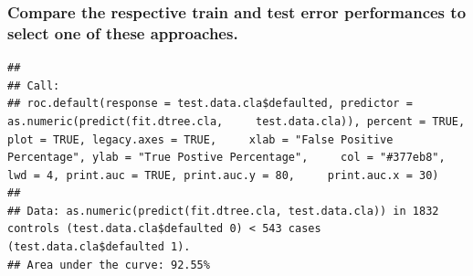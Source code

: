 \documentclass[]{article}
\newenvironment{Shaded}{\begin{snugshade}}{\end{snugshade}}
\newcommand{\DataTypeTok}[1]{\textcolor[rgb]{0.13,0.29,0.53}{#1}}
\newcommand{\DecValTok}[1]{\textcolor[rgb]{0.00,0.00,0.81}{#1}}
\newcommand{\KeywordTok}[1]{\textcolor[rgb]{0.13,0.29,0.53}{\textbf{#1}}}
\newcommand{\NormalTok}[1]{#1}
\newcommand{\OperatorTok}[1]{\textcolor[rgb]{0.81,0.36,0.00}{\textbf{#1}}}
\newcommand{\OtherTok}[1]{\textcolor[rgb]{0.56,0.35,0.01}{#1}}
\newcommand{\StringTok}[1]{\textcolor[rgb]{0.31,0.60,0.02}{#1}}
\begin{document}
\hypertarget{compare-the-respective-train-and-test-error-performances-to-select-one-of-these-approaches.}{%
\subsubsection{Compare the respective train and test error performances
to select one of these
approaches.}\label{compare-the-respective-train-and-test-error-performances-to-select-one-of-these-approaches.}}

\begin{Shaded}
\end{Shaded}

\begin{verbatim}
## 
## Call:
## roc.default(response = test.data.cla$defaulted, predictor = as.numeric(predict(fit.dtree.cla,     test.data.cla)), percent = TRUE, plot = TRUE, legacy.axes = TRUE,     xlab = "False Positive Percentage", ylab = "True Postive Percentage",     col = "#377eb8", lwd = 4, print.auc = TRUE, print.auc.y = 80,     print.auc.x = 30)
## 
## Data: as.numeric(predict(fit.dtree.cla, test.data.cla)) in 1832 controls (test.data.cla$defaulted 0) < 543 cases (test.data.cla$defaulted 1).
## Area under the curve: 92.55%
\end{verbatim}
\end{document}
